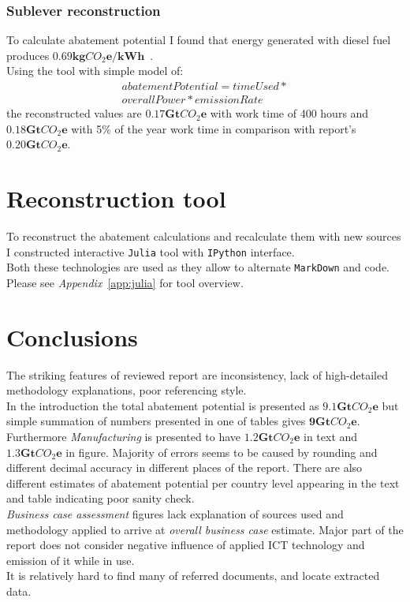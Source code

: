 \documentclass[11pt, twocolumn]{article}
\begin{document}
\subsubsection{Sublever reconstruction\label{sec:off-grid:reconstruction}}
To calculate abatement potential I found that energy generated with diesel fuel produces $\mathbf{0.69kg}CO_2\mathbf{e}/\mathbf{kWh}$~\citep{iea2012co2}.\\
Using the tool with simple model of:\\
\begin{gather*}
  abatementPotential = timeUsed *\\
  overallPower * emissionRate
\end{gather*}
the reconstructed values are $\mathbf{0.17} \mathbf{Gt}CO_2\mathbf{e}$ with work time of 400 hours and $\mathbf{0.18} \mathbf{Gt}CO_2\mathbf{e}$ with 5\% of the year work time in comparison with report's $\mathbf{0.20} \mathbf{Gt}CO_2\mathbf{e}$.
\newpage




\section{Reconstruction tool}
To reconstruct the abatement calculations and recalculate them with new sources I constructed interactive \texttt{Julia} tool with \texttt{IPython} interface.\\
Both these technologies are used as they allow to alternate \texttt{MarkDown} and code. Please see \emph{Appendix}~\ref{app:julia} for tool overview.

\section{Conclusions}
The striking features of reviewed report are inconsistency, lack of high-detailed methodology explanations, poor referencing style.\\
In the introduction the total abatement potential is presented as $\mathbf{9.1} \mathbf{Gt}CO_2\mathbf{e}$ but simple summation of numbers presented in one of tables gives $\mathbf{9} \mathbf{Gt}CO_2\mathbf{e}$. Furthermore \emph{Manufacturing} is presented to have $\mathbf{1.2} \mathbf{Gt}CO_2\mathbf{e}$ in text and $\mathbf{1.3} \mathbf{Gt}CO_2\mathbf{e}$ in figure. Majority of errors seems to be caused by rounding and different decimal accuracy in different places of the report. There are also different estimates of abatement potential per country level appearing in the text and table indicating poor sanity check.\\
\emph{Business case assessment} figures lack explanation of sources used and methodology applied to arrive at \emph{overall business case} estimate. Major part of the report does not consider negative influence of applied ICT technology and emission of it while in use.\\
It is relatively hard to find many of referred documents, and locate extracted data.\\
\end{document}
